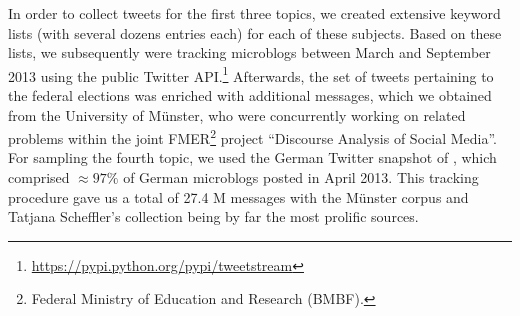 In order to collect tweets for the first three topics, we created
extensive keyword lists (with several dozens entries each) for each of
these subjects.  Based on these lists, we subsequently were tracking
microblogs between March and September 2013 using the public Twitter
API.\footnote{\url{https://pypi.python.org/pypi/tweetstream}}
Afterwards, the set of tweets pertaining to the federal elections was
enriched with additional messages, which we obtained from the
University of M\"unster, who were concurrently working on related
problems within the joint FMER\footnote{Federal Ministry of Education
  and Research (BMBF).} project ``Discourse Analysis of Social
Media''.  For sampling the fourth topic, we used the German Twitter
snapshot of \citet{Scheffler:14}, which comprised $\approx97\%$ of
German microblogs posted in April 2013.  This tracking procedure gave
us a total of 27.4 M messages with the M\"unster corpus and Tatjana
Scheffler's collection being by far the most prolific sources.






